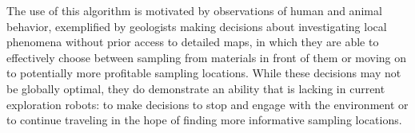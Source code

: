 The use of this algorithm is motivated by observations of human and animal behavior, exemplified by geologists making decisions about investigating local phenomena without prior access to detailed maps, in which they are able to effectively choose between sampling from materials in front of them or moving on to potentially more profitable sampling locations.  While these decisions may not be globally optimal, they do demonstrate an ability that is lacking in current exploration robots: to make decisions to stop and engage with the environment or to continue traveling in the hope of finding more informative sampling locations.




	
	



